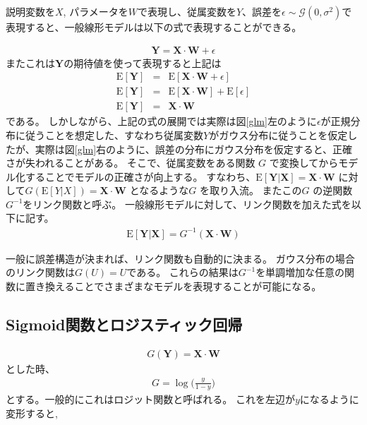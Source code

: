 説明変数を$ X $, パラメータを$ W $で表現し、従属変数を$ Y $、誤差を$ \epsilon \sim \mathcal{G}(0, \sigma^2) $で表現すると、一般線形モデルは以下の式で表現することができる。

\begin{eqnarray}
\mathbf{Y} = \mathbf{X} \cdot  \mathbf{W} + \epsilon
\label{eq:senkei}
\end{eqnarray}
またこれは$ \mathbf{Y} $の期待値を使って表現すると上記は
\begin{eqnarray}
    \mathrm{E}[\mathbf{Y}] &=& \mathrm{E}[\mathbf{X} \cdot  \mathbf{W} + \epsilon] \\
    \mathrm{E}[\mathbf{Y}] &=& \mathrm{E}[\mathbf{X} \cdot  \mathbf{W}] + \mathrm{E}[\epsilon] \\
    \mathrm{E}[\mathbf{Y}] &=& \mathbf{X} \cdot  \mathbf{W}
\label{eq:link}
\end{eqnarray}
である。
しかしながら、上記の式の展開では実際は図\ref{glm}左のように$ \epsilon $が正規分布に従うことを想定した、すなわち従属変数$ Y $がガウス分布に従うことを仮定したが、実際は図\ref{glm}右のように、誤差の分布にガウス分布を仮定すると、正確さが失われることがある。
そこで、従属変数をある関数 $ G $ で変換してからモデル化することでモデルの正確さが向上する。
すなわち、$ \mathrm{E}[\mathbf{Y|X}] = \mathbf{X} \cdot  \mathbf{W} $ に対して$ G(\mathrm{E}[Y|X]) = \mathbf{X} \cdot  \mathbf{W} $ となるような$ G $ を取り入流。
またこの$ G $ の逆関数 $ G^{-1} $をリンク関数と呼ぶ。
一般線形モデルに対して、リンク関数を加えた式を以下に記す。
\begin{eqnarray}
\mathrm{E}[\mathbf{Y|X}]=G^{-1} (\mathbf{X}\cdot  \mathbf{W})
\label{eq:link}
\end{eqnarray}

一般に誤差構造が決まれば、リンク関数も自動的に決まる。
ガウス分布の場合のリンク関数は$ G(U) = U $である。
これらの結果は$ G^{-1} $を単調増加な任意の関数に置き換えることでさまざまなモデルを表現することが可能になる。


\subsection{Sigmoid関数とロジスティック回帰}
\begin{eqnarray}
G(\mathbf{Y})=\mathbf{X}\cdot  \mathbf{W}
\end{eqnarray}
とした時、
\begin{eqnarray}
G=\log \bigl(\frac{y}{1-y}\bigr)
\end{eqnarray}
とする。一般的にこれはロジット関数と呼ばれる。
これを左辺が$ y $になるように変形すると,

